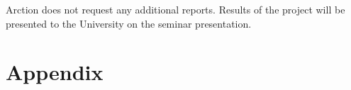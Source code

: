 \documentclass[english]{article}
\begin{document}
Arction does not request any additional reports. Results of the project will be presented to the University on the seminar presentation.
\section{Appendix}

\end{document}
